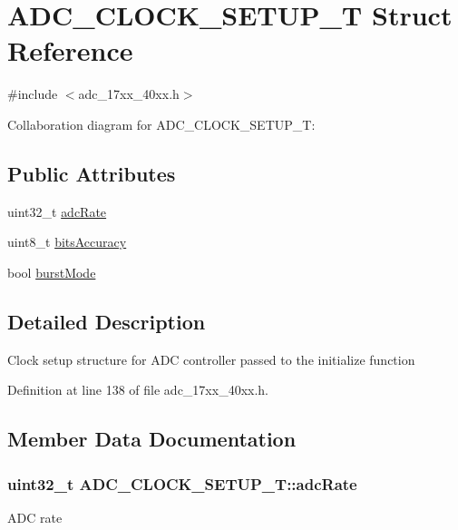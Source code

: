 \hypertarget{structADC__CLOCK__SETUP__T}{}\section{A\+D\+C\+\_\+\+C\+L\+O\+C\+K\+\_\+\+S\+E\+T\+U\+P\+\_\+T Struct Reference}
\label{structADC__CLOCK__SETUP__T}


{\ttfamily \#include $<$adc\+\_\+17xx\+\_\+40xx.\+h$>$}



Collaboration diagram for A\+D\+C\+\_\+\+C\+L\+O\+C\+K\+\_\+\+S\+E\+T\+U\+P\+\_\+T\+:
\subsection*{Public Attributes}
\begin{DoxyCompactItemize}
\item 
uint32\+\_\+t \hyperlink{structADC__CLOCK__SETUP__T_a8948fd266d15eee3d090cab24a64ff42}{adc\+Rate}
\item 
uint8\+\_\+t \hyperlink{structADC__CLOCK__SETUP__T_aeb37891571691033d98087dabf6ddbd5}{bits\+Accuracy}
\item 
bool \hyperlink{structADC__CLOCK__SETUP__T_a92bc50d4472a36de38dac15a5fd3109a}{burst\+Mode}
\end{DoxyCompactItemize}


\subsection{Detailed Description}
Clock setup structure for A\+DC controller passed to the initialize function 

Definition at line 138 of file adc\+\_\+17xx\+\_\+40xx.\+h.



\subsection{Member Data Documentation}
\subsubsection[{\texorpdfstring{adc\+Rate}{adcRate}}]{\setlength{\rightskip}{0pt plus 5cm}uint32\+\_\+t A\+D\+C\+\_\+\+C\+L\+O\+C\+K\+\_\+\+S\+E\+T\+U\+P\+\_\+\+T\+::adc\+Rate}\hypertarget{structADC__CLOCK__SETUP__T_a8948fd266d15eee3d090cab24a64ff42}{}\label{structADC__CLOCK__SETUP__T_a8948fd266d15eee3d090cab24a64ff42}
A\+DC rate 

